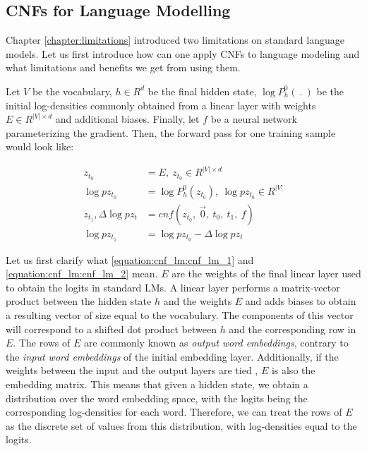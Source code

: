 \subsection{CNFs for Language Modelling}

Chapter \ref{chapter:limitations} introduced two limitations on standard language models. Let us first introduce how can one apply CNFs to language modeling and what limitations and benefits we get from using them.

Let $ V $ be the vocabulary, $ h \in R^d $ be the final hidden state, $ \log P_h^0(\ . \ ) $ be the initial log-densities commonly obtained from a linear layer with weights $ E \in R^{|V| \times d} $ and additional biases. Finally, let $ f $ be a neural network parameterizing the gradient. Then, the forward pass for one training sample would look like:

\begin{align}
    \label{equation:cnf_lm:cnf_lm_1}
    z_{t_0} &= E , \ z_{t_0} \in R^{|V| \times d} \\
    \label{equation:cnf_lm:cnf_lm_2}
    \log pz_{t_0} &= \log P_h^0(z_{t_0}), \ \log pz_{t_0} \in R^{|V|} \\
    \label{equation:cnf_lm:cnf_lm_3}
    z_{t_1}, \Delta \log pz_t &= cnf(z_{t_0}, \ \vec{0}, \ t_0 , \ t_1 , \ f) \\
    \label{equation:cnf_lm:cnf_lm_4}
    \log pz_{t_1} &= \log pz_{t_0} -  \Delta \log  pz_t
\end{align}

Let us first clarify what \ref{equation:cnf_lm:cnf_lm_1} and \ref{equation:cnf_lm:cnf_lm_2} mean. $ E $ are the weights of the final linear layer used to obtain the logits in standard LMs. A linear layer performs a matrix-vector product between the hidden state $ h $ and the weights $ E $ and adds biases to obtain a resulting vector of size equal to the vocabulary. The components of this vector will correspond to a shifted dot product between $ h $ and the corresponding row in $ E $. The rows of $ E $ are commonly known as \emph{output word embeddings}, contrary to the \emph{input word embeddings} of the initial embedding layer. Additionally, if the weights between the input and the output layers are tied \citep{inan2016tying}, $ E $ is also the embedding matrix. This means that given a hidden state, we obtain a distribution over the word embedding space, with the logits being the corresponding log-densities for each word. Therefore, we can treat the rows of $ E $ as the discrete set of values from this distribution, with log-densities equal to the logits.

